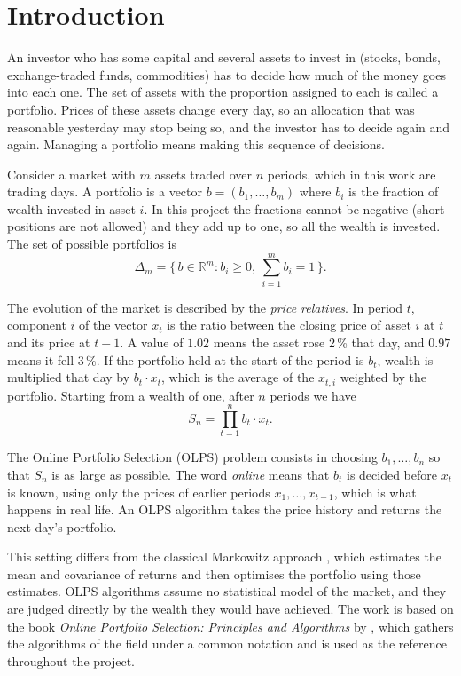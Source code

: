 \chapter{Introduction}

An investor who has some capital and several assets to invest in (stocks, bonds,
exchange-traded funds, commodities) has to decide how much of the money goes into
each one. The set of assets with the proportion assigned to each is called a
portfolio. Prices of these assets change every day, so an allocation that was
reasonable yesterday may stop being so, and the investor has to decide again and
again. Managing a portfolio means making this sequence of decisions.

Consider a market with $m$ assets traded over $n$ periods, which in this work are
trading days. A portfolio is a vector $b=(b_1,\dots,b_m)$ where $b_i$ is the
fraction of wealth invested in asset $i$. In this project the fractions cannot be
negative (short positions are not allowed) and they add up to one, so all the
wealth is invested. The set of possible portfolios is
\[
\Delta_m=\Big\{\,b\in\mathbb{R}^m : b_i\ge 0,\ \textstyle\sum_{i=1}^m b_i=1\,\Big\}.
\]

The evolution of the market is described by the \emph{price relatives}. In period
$t$, component $i$ of the vector $x_t$ is the ratio between the closing price of
asset $i$ at $t$ and its price at $t-1$. A value of $1.02$ means the asset rose
2\,\% that day, and $0.97$ means it fell 3\,\%. If the portfolio held at the start
of the period is $b_t$, wealth is multiplied that day by $b_t\cdot x_t$, which is
the average of the $x_{t,i}$ weighted by the portfolio. Starting from a wealth of
one, after $n$ periods we have
\[
S_n=\prod_{t=1}^{n} b_t\cdot x_t .
\]

The Online Portfolio Selection (OLPS) problem consists in choosing $b_1,\dots,b_n$
so that $S_n$ is as large as possible. The word \emph{online} means that $b_t$ is
decided before $x_t$ is known, using only the prices of earlier periods
$x_1,\dots,x_{t-1}$, which is what happens in real life. An OLPS algorithm takes
the price history and returns the next day's portfolio.

This setting differs from the classical Markowitz approach \parencite{markowitz}, which
estimates the mean and covariance of returns and then optimises the portfolio using
those estimates. OLPS algorithms assume no statistical model of the market, and they
are judged directly by the wealth they would have achieved. The work is based on the
book \emph{Online Portfolio Selection: Principles and Algorithms} by \textcite{lihoi}, which gathers the algorithms of the field under a common
notation and is used as the reference throughout the project.
